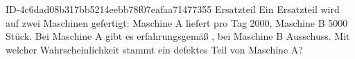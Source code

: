 \begin{exercise}
      {ID-4c6dad08b317bb5214eebb78f07eafaa71477355}
      {Ersatzteil}
  \ifproblem\problem
    Ein Ersatzteil wird auf zwei Maschinen gefertigt: Maschine A liefert
    pro Tag 2000, Maschine B 5000 Stück. Bei Maschine A gibt es
    erfahrungsgemäß , bei Maschine B  Ausschuss.
    Mit welcher Wahrscheinlichkeit stammt ein defektes Teil von Maschine A?
  \fi
\end{exercise}

